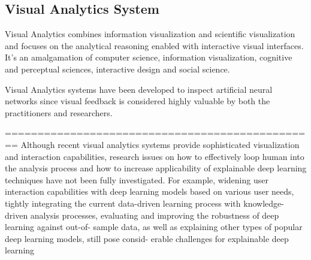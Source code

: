 \subsection{Visual Analytics System}
    
Visual Analytics combines information visualization and scientific visualization and focuses on the analytical reasoning enabled with interactive visual interfaces. It’s an amalgamation of computer science, information visualization, cognitive and perceptual sciences, interactive design and social science.

Visual Analytics systems have been developed to inspect artificial neural networks since visual feedback is considered highly valuable by both the practitioners and researchers.

================================================
Although recent visual analytics systems provide sophisticated visualization and interaction capabilities, research issues on how to effectively loop human into the analysis process and how to increase applicability of explainable deep learning techniques have not been fully investigated. For example, widening user interaction capabilities with deep learning models based on various user needs, tightly integrating the current data-driven learning process with knowledge-driven analysis processes, evaluating and improving the robustness of deep learning against out-of- sample data, as well as explaining other types of popular deep learning models, still pose consid- erable challenges for explainable deep learning

